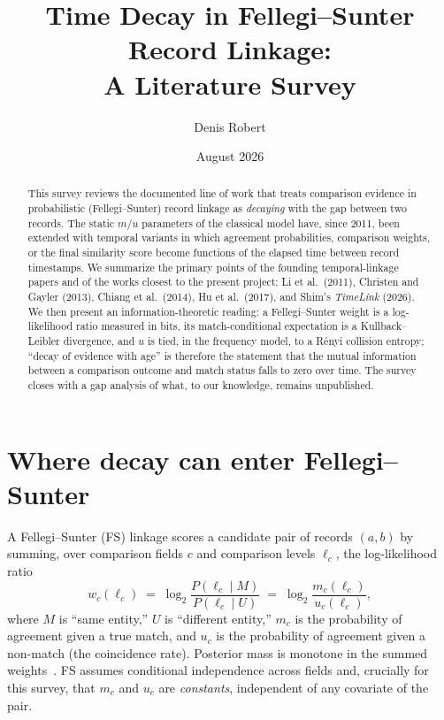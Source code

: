 \documentclass[11pt]{article}
\title{Time Decay in Fellegi--Sunter Record Linkage:\\A Literature Survey}
\author{Denis Robert}
\date{August 2026}
\begin{document}
\maketitle

\begin{abstract}
This survey reviews the documented line of work that treats comparison evidence in
probabilistic (Fellegi--Sunter) record linkage as \emph{decaying} with the gap between two
records. The static $m/u$ parameters of the classical model have, since 2011, been extended
with temporal variants in which agreement probabilities, comparison weights, or the final
similarity score become functions of the elapsed time between record timestamps. We
summarize the primary points of the founding temporal-linkage papers and of the works closest
to the present project: Li et al.\ (2011), Christen and Gayler (2013), Chiang et al.\ (2014),
Hu et al.\ (2017), and Shim's \emph{TimeLink} (2026). We then present an information-theoretic reading:
a Fellegi--Sunter weight is a log-likelihood ratio measured in bits, its match-conditional
expectation is a Kullback--Leibler divergence, and $u$ is tied, in the frequency model, to a
R\'enyi collision entropy; ``decay of evidence with age'' is therefore the statement that the
mutual information between a comparison outcome and match status falls to zero over time. The
survey closes with a gap analysis of what, to our knowledge, remains unpublished.
\end{abstract}

\section{Where decay can enter Fellegi--Sunter}

A Fellegi--Sunter (FS) linkage scores a candidate pair of records $(a,b)$ by summing, over
comparison fields $c$ and comparison levels $\ell_c$, the log-likelihood ratio
\begin{equation}
  \label{eq:fs}
  w_c(\ell_c)\;=\;\log_2\frac{P(\ell_c \mid M)}{P(\ell_c \mid U)}
                \;=\;\log_2\frac{m_c(\ell_c)}{u_c(\ell_c)},
\end{equation}
where $M$ is ``same entity,'' $U$ is ``different entity,'' $m_c$ is the probability of
agreement given a true match, and $u_c$ is the probability of agreement given a non-match
(the coincidence rate). Posterior mass is monotone in the summed weights~\cite{fellegi1969,winkler1993}. FS assumes
conditional independence across fields and, crucially for this survey, that $m_c$ and $u_c$
are \emph{constants}, independent of any covariate of the pair.
\end{document}
